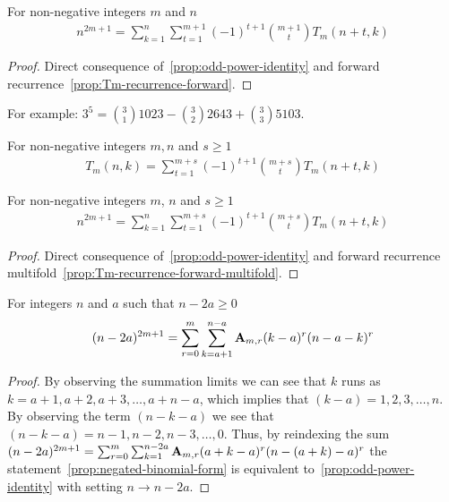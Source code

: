 \begin{proposition}
    \label{prop:odd-power-decomposition-forward}
    For non-negative integers $m$ and $n$
    \begin{align*}
        n^{2m+1} = \sum_{k=1}^{n} \sum_{t=1}^{m+1} (-1)^{t+1} \binom{m+1}{t} T_{m} (n+t, k)
    \end{align*}
    \begin{proof}
        Direct consequence of~\eqref{prop:odd-power-identity}
        and forward recurrence~\eqref{prop:Tm-recurrence-forward}.
    \end{proof}
\end{proposition}
For example: $3^5 = \binom{3}{1} 1023 - \binom{3}{2} 2643 + \binom{3}{3} 5103$.
\begin{proposition}
    For non-negative integers $m,n$ and $s \geq 1$
    \label{prop:Tm-recurrence-forward-multifold}
    \begin{align*}
        T_{m} (n,k) = \sum_{t=1}^{m+s} (-1)^{t+1} \binom{m+s}{t} T_{m} (n+t, k)
    \end{align*}
\end{proposition}

\begin{proposition}
    \label{prop:odd-power-decomposition-forward-multifold}
    For non-negative integers $m$, $n$ and $s \geq 1$
    \begin{align*}
        n^{2m+1} = \sum_{k=1}^{n} \sum_{t=1}^{m+s} (-1)^{t+1} \binom{m+s}{t} T_{m} (n+t, k)
    \end{align*}
    \begin{proof}
        Direct consequence of~\eqref{prop:odd-power-identity}
        and forward recurrence multifold~\eqref{prop:Tm-recurrence-forward-multifold}.
    \end{proof}
\end{proposition}
\begin{proposition}
    \label{prop:negated-binomial-form}
    For integers $n$ and $a$ such that $n-2a \geq 0$
    \begin{align*}
    (n-2a)^{2m+1} = \sum_{r=0}^{m} \sum_{k=a+1}^{n-a} {\mathbf{A}} \sb{m,r} (k-a)^r (n-a-k)^r
    \end{align*}
    \begin{proof}
        By observing the summation limits we can see that $k$ runs as $k=a+1,a+2,a+3,\ldots,a+n-a$, which
        implies that $(k-a)=1,2,3,\ldots, n$.
        By observing the term $(n-k-a)$ we see that $(n-k-a)=n-1,n-2,n-3,\ldots,0$.
        Thus, by reindexing the sum
        $(n-2a)^{2m+1} = \sum_{r=0}^{m} \sum_{k=1}^{n-2a} {\mathbf{A}} \sb{m,r} (a+k-a)^r (n-(a+k)-a)^r$
        the statement~\eqref{prop:negated-binomial-form} is equivalent to~\eqref{prop:odd-power-identity}
        with setting $n \rightarrow n-2a$.
    \end{proof}
\end{proposition}

